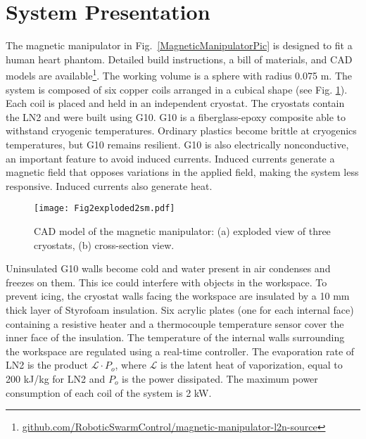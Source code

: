 \section{System Presentation}\label{sec:System}
The magnetic manipulator in Fig.~\ref{MagneticManipulatorPic} is designed to fit a human heart phantom. 
Detailed build instructions, a bill of materials, and CAD models are available\footnote{\href{https://github.com/RoboticSwarmControl/magnetic-manipulator-l2n-source}{github.com/RoboticSwarmControl/magnetic-manipulator-l2n-source}}.
The working volume is a sphere with radius 0.075 m. %
The system is composed of six copper coils arranged in a cubical shape (see Fig. \ref{CAD}). 
   Each coil is placed and held in an independent cryostat. 
 The cryostats contain the LN2 and were built using G10. 
 G10 is a fiberglass-epoxy composite able to withstand cryogenic temperatures. 
 Ordinary plastics become brittle at cryogenics temperatures, but G10 remains resilient. 
 G10 is also electrically nonconductive, an important feature to avoid induced currents.
 Induced currents generate a magnetic field that opposes variations in the applied field, making the system less responsive.
 Induced currents also generate heat.
\par
% 
\begin{figure}
	\texttt{[image: Fig2exploded2sm.pdf]}
	\caption{CAD model of the magnetic manipulator: (a) exploded view of three cryostats, (b) cross-section view.}
	\label{CAD}
\end{figure}
 Uninsulated G10 walls become cold and water present in air condenses and freezes on them. 
  This ice could interfere with objects in the workspace. 
  To prevent icing, the cryostat walls facing the workspace are insulated by a  10 mm thick layer of Styrofoam insulation.  %
Six acrylic plates (one for each internal face) containing a resistive heater and a  thermocouple temperature sensor cover the inner face of the insulation.
  The temperature of the internal walls surrounding the workspace are regulated using a real-time controller.
The evaporation rate  of LN2 is the product $\mathscr{L}\cdot P_o$,  where $\mathscr{L}$ is the latent heat of vaporization, equal to 200 kJ/kg for LN2 and $P_o$ is the power dissipated. The maximum power consumption of each coil of the system is 2 kW. 

